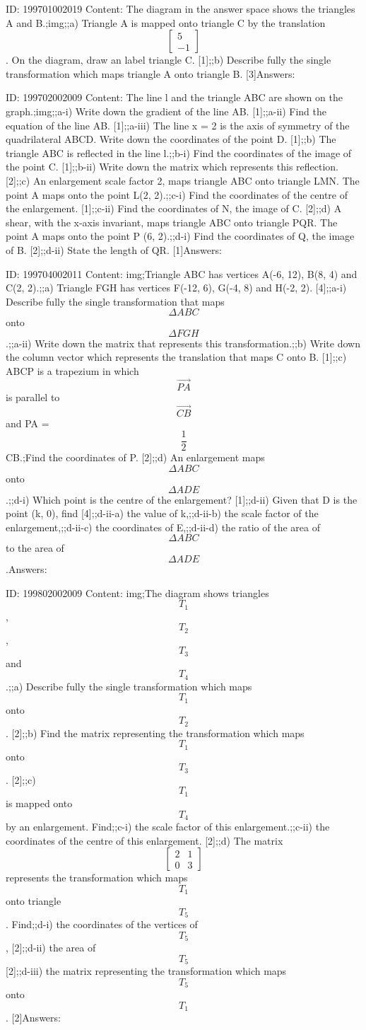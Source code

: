 \documentclass{article}
\begin{document}
ID: 199701002019
Content:
The diagram in the answer space shows the triangles A and B.;img;;a) Triangle A is mapped onto triangle C by the translation $$\begin{bmatrix}5\\-1\end{bmatrix}$$. On the diagram, draw an label triangle C. [1];;b) Describe fully the single transformation which maps triangle A onto triangle B. [3]Answers:

ID: 199702002009
Content:
The line l and the triangle ABC are shown on the graph.;img;;a-i) Write down the gradient of the line AB. [1];;a-ii) Find the equation of the line AB. [1];;a-iii) The line x = 2 is the axis of symmetry of the quadrilateral ABCD. Write down the coordinates of the point D. [1];;b) The triangle ABC is reflected in the line l.;;b-i) Find the coordinates of the image of the point C. [1];;b-ii) Write down the matrix which represents this reflection. [2];;c) An enlargement scale factor 2, maps triangle ABC onto triangle LMN. The point A maps onto the point L(2, 2).;;c-i) Find the coordinates of the centre of the enlargement. [1];;c-ii) Find the coordinates of N, the image of C. [2];;d) A shear, with the x-axis invariant, maps triangle ABC onto triangle PQR. The point A maps onto the point P (6, 2).;;d-i) Find the coordinates of Q, the image of B. [2];;d-ii) State the length of QR. [1]Answers:

ID: 199704002011
Content:
img;Triangle ABC has vertices A(-6, 12), B(8, 4) and C(2, 2).;;a) Triangle FGH has vertices F(-12, 6), G(-4, 8) and H(-2, 2). [4];;a-i) Describe fully the single transformation that maps $$\Delta ABC$$ onto $$\Delta FGH$$.;;a-ii) Write down the matrix that represents this transformation.;;b) Write down the column vector which represents the translation that maps C onto B. [1];;c) ABCP is a trapezium in which $$\vec{PA}$$ is parallel to $$\vec{CB}$$ and PA = $$\frac{1}{2}$$CB.;Find the coordinates of P. [2];;d) An enlargement maps $$\Delta ABC$$  onto $$\Delta ADE$$.;;d-i) Which point is the centre of the enlargement? [1];;d-ii) Given that D is the point (k, 0), find [4];;d-ii-a) the value of k,;;d-ii-b) the scale factor of the enlargement,;;d-ii-c) the coordinates of E,;;d-ii-d) the ratio of the area of $$\Delta ABC$$  to the area of $$\Delta ADE$$.Answers:

ID: 199802002009
Content:
img;The diagram shows triangles $$T_1$$, $$T_2$$, $$T_3$$ and $$T_4$$.;;a) Describe fully the single transformation which maps $$T_1$$ onto $$T_2$$. [2];;b) Find the matrix representing the transformation which maps $$T_1$$ onto $$T_3$$. [2];;c) $$T_1$$ is mapped onto $$T_4$$ by an enlargement. Find;;c-i) the scale factor of this enlargement.;;c-ii) the coordinates of the centre of this enlargement. [2];;d) The matrix $$\begin{bmatrix}2&1\\0&3\end{bmatrix}$$ represents the transformation which maps $$T_1$$ onto triangle $$T_5$$. Find;;d-i) the coordinates of the vertices of $$T_5$$, [2];;d-ii) the area of $$T_5$$ [2];;d-iii) the matrix representing the transformation which maps $$T_5$$ onto $$T_1$$. [2]Answers:
\end{document}
